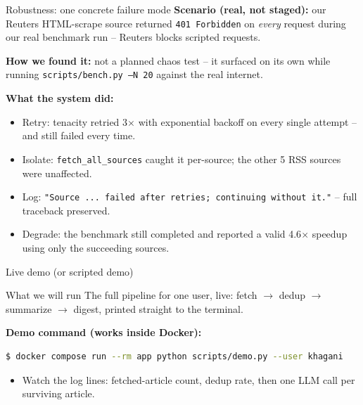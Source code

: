 \documentclass[aspectratio=169,11pt]{beamer}
\begin{document}
\begin{frame}{Robustness: one concrete failure mode}
  \textbf{Scenario (real, not staged):} our Reuters HTML-scrape source returned \texttt{401 Forbidden} on \emph{every} request during our real benchmark run -- Reuters blocks scripted requests.

  \vspace{0.3em}
  \textbf{How we found it:} not a planned chaos test -- it surfaced on its own while running \texttt{scripts/bench.py --N 20} against the real internet.

  \vspace{0.3em}
  \textbf{What the system did:}
  \begin{itemize}\setlength\itemsep{0.3em}
    \item Retry: tenacity retried 3$\times$ with exponential backoff on every single attempt -- and still failed every time.
    \item Isolate: \texttt{fetch\_all\_sources} caught it per-source; the other 5 RSS sources were unaffected.
    \item Log: \texttt{"Source ... failed after retries; continuing without it."} -- full traceback preserved.
    \item Degrade: the benchmark still completed and reported a valid 4.6$\times$ speedup using only the succeeding sources.
  \end{itemize}
  
\end{frame}

\begin{frame}[fragile]{Live demo (or scripted demo)}
  \begin{block}{What we will run}
    The full pipeline for one user, live: fetch $\to$ dedup $\to$ summarize $\to$ digest, printed straight to the terminal.
  \end{block}

  \vspace{0.4em}
  \textbf{Demo command (works inside Docker):}
  \begin{lstlisting}[style=python,language=bash,numbers=none]
$ docker compose run --rm app python scripts/demo.py --user khagani
\end{lstlisting}

  \vspace{0.4em}
  \begin{itemize}
    \item Watch the log lines: fetched-article count, dedup rate, then one LLM call per surviving article.
  \end{itemize}

  \vspace{0.3em}
\end{frame}
\end{document}
